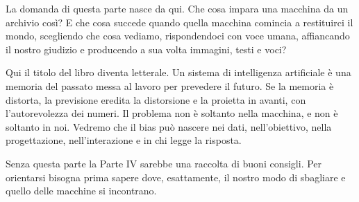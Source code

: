 La domanda di questa parte nasce da qui. Che cosa impara una macchina da un archivio così? E che cosa succede quando quella macchina comincia a restituirci il mondo, scegliendo che cosa vediamo, rispondendoci con voce umana, affiancando il nostro giudizio e producendo a sua volta immagini, testi e voci?

Qui il titolo del libro diventa letterale. Un sistema di intelligenza artificiale è una memoria del passato messa al lavoro per prevedere il futuro. Se la memoria è distorta, la previsione eredita la distorsione e la proietta in avanti, con l'autorevolezza dei numeri. Il problema non è soltanto nella macchina, e non è soltanto in noi. Vedremo che il bias può nascere nei dati, nell'obiettivo, nella progettazione, nell'interazione e in chi legge la risposta.

Senza questa parte la Parte IV sarebbe una raccolta di buoni consigli. Per orientarsi bisogna prima sapere dove, esattamente, il nostro modo di sbagliare e quello delle macchine si incontrano.

\cleardoublepage
